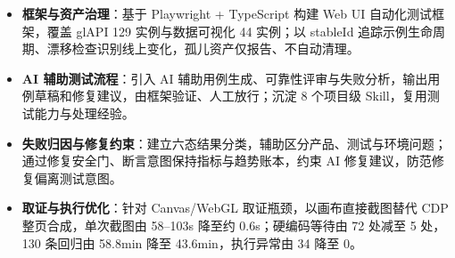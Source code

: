 \documentclass[10pt]{article}
\begin{document}
    \begin{itemize}
        \item \textbf{框架与资产治理}：基于 Playwright + TypeScript 构建 Web UI 自动化测试框架，覆盖 glAPI 129 实例与数据可视化 44 实例；以 stableId 追踪示例生命周期、漂移检查识别线上变化，孤儿资产仅报告、不自动清理。
        \item \textbf{AI 辅助测试流程}：引入 AI 辅助用例生成、可靠性评审与失败分析，输出用例草稿和修复建议，由框架验证、人工放行；沉淀 8 个项目级 Skill，复用测试能力与处理经验。
        \item \textbf{失败归因与修复约束}：建立六态结果分类，辅助区分产品、测试与环境问题；通过修复安全门、断言意图保持指标与趋势账本，约束 AI 修复建议，防范修复偏离测试意图。
        \item \textbf{取证与执行优化}：针对 Canvas/WebGL 取证瓶颈，以画布直接截图替代 CDP 整页合成，单次截图由 58--103s 降至约 0.6s；硬编码等待由 72 处减至 5 处，130 条回归由 58.8min 降至 43.6min，执行异常由 34 降至 0。
    \end{itemize}

    \vspace{0.25em}

\end{document}
